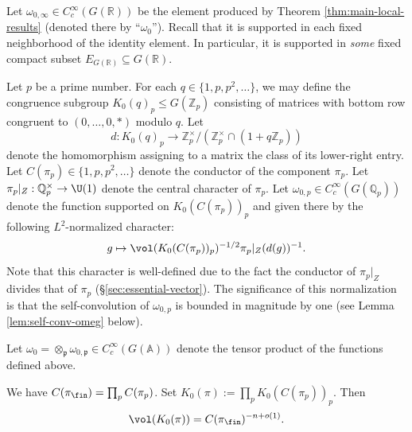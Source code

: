 Let $\omega_{0,\infty} \in C_c^\infty(G(\mathbb{R}))$ be the element produced by Theorem \ref{thm:main-local-results} (denoted there by ``$\omega_0$'').  Recall that it is supported in each fixed neighborhood of the identity element.  In particular, it is supported in \emph{some} fixed compact subset  $E_{G(\mathbb{R})} \subseteq G(\mathbb{R})$.

Let $p$ be a prime number.  For each $q \in \{1, p, p^2, \dotsc\}$, we may define the congruence subgroup $K_0(q)_p \leq G(\mathbb{Z}_p)$ consisting of matrices with bottom row congruent to $(0,\dotsc,0,\ast)$ modulo $q$.  Let
\begin{equation*}
  d : K_0(q)_p \rightarrow \mathbb{Z}_p^\times / (\mathbb{Z}_p^\times \cap (1 + q \mathbb{Z}_p))
\end{equation*}
denote the homomorphism assigning to a matrix the class of its lower-right entry.  Let $C(\pi_p) \in \{1, p, p^2, \dotsc \}$ denote the conductor of the component $\pi_p$.  Let $\pi_p|_{Z} : \mathbb{Q}_p^\times \rightarrow \U(1)$ denote the central character of $\pi_p$.  Let $\omega_{0,p} \in C_c^\infty(G(\mathbb{Q}_p))$ denote the function supported on  $K_0(C(\pi_p))_p$ and given there by the following $L^2$-normalized character:
\begin{equation*}
  g \mapsto \vol(K_0(C(\pi_p))_p)^{-1/2} \pi_p|_{Z}(d(g))^{-1}.
\end{equation*}
Note that this character is well-defined due to the fact the conductor of $\pi_p|_{Z}$ divides that of $\pi_p$ (\S\ref{sec:essential-vector}).  The significance of this normalization is that the self-convolution of $\omega_{0,p}$ is bounded in magnitude by one (see Lemma \ref{lem:self-conv-omeg} below).

Let $\omega_0 = \otimes_{\mathfrak{p}} \omega_{0,\mathfrak{p}} \in C_c^\infty(G(\mathbb{A}))$ denote the tensor product of the functions defined above.

We have $C(\pi_{\fin}) = \prod_p C(\pi_p)$.  Set $K_0(\pi) := \prod_p K_0(C(\pi_p))_p$.  Then
\begin{equation}\label{eq:volk_0pi-=-cpiinfty}
  \vol(K_0(\pi)) = C(\pi_{\fin})^{-n+o(1)}.
\end{equation}

